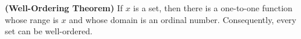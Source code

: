 \textbf{(Well-Ordering Theorem)} If $x$ is a set, then there is a one-to-one function whose range is $x$ and whose domain is an ordinal number. Consequently, every set can be well-ordered.
